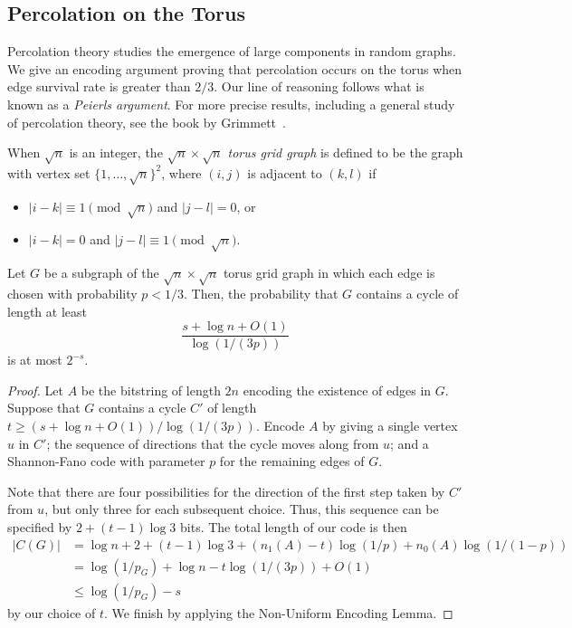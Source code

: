 \documentclass{patmorin}
\begin{document}
\subsection{Percolation on the Torus}

Percolation theory studies the emergence of large components in random
graphs. We give an encoding argument proving that percolation occurs
on the torus when edge survival rate is greater than $2/3$. Our line
of reasoning follows what is known as a \emph{Peierls argument}. For
more precise results, including a general study of percolation theory,
see the book by Grimmett~\cite{grimmett:percolation}.

When $\sqrt{n}$ is an integer, the \emph{$\sqrt{n} \times \sqrt{n}$
  torus grid graph} is defined to be the graph with vertex set
$\{1, \ldots, \sqrt{n}\}^2$, where $(i, j)$ is adjacent to $(k, l)$
if
\begin{itemize}[topsep=0pt]
\item $|i - k| \equiv 1 \pmod{\sqrt{n}}$ and $|j - l| = 0$, or
\item $|i - k| = 0$ and $|j - l| \equiv 1 \pmod{\sqrt{n}}$.
\end{itemize}

\begin{thm}
  Let $G$ be a subgraph of the $\sqrt{n} \times \sqrt{n}$ torus grid
  graph in which each edge is chosen with probability $p < 1/3$. Then,
  the probability that $G$ contains a cycle of length at least
  \[
    \frac{s + \log n + O(1)}{\log (1/(3p))}
  \]
  is at most $2^{-s}$.
\end{thm}
\begin{proof}
  Let $A$ be the bitstring of length $2n$ encoding the existence of
  edges in $G$. Suppose that $G$ contains a cycle $C'$ of length
  $t \geq (s + \log n + O(1))/\log (1/(3p))$. Encode $A$ by giving a
  single vertex $u$ in $C'$; the sequence of directions that the cycle
  moves along from $u$; and a Shannon-Fano code with parameter $p$ for
  the remaining edges of $G$.

  Note that there are four possibilities for the direction of the
  first step taken by $C'$ from $u$, but only three for each
  subsequent choice. Thus, this sequence can be specified by
  $2 + (t - 1) \log 3$ bits. The total length of our code is then
  \begin{align*}
    |C(G)| &= \log n + 2 + (t - 1) \log 3 + (n_1(A) - t) \log (1/p) +
             n_0(A) \log (1/(1 - p)) \\
           &= \log (1/p_G) + \log n - t \log (1/(3p)) + O(1) \\
           &\leq \log (1/p_G) - s
  \end{align*}
  by our choice of $t$. We finish by applying the Non-Uniform Encoding
  Lemma.
\end{proof}
\end{document}
